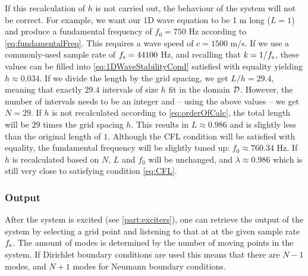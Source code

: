 If this recalculation of $h$ is not carried out, the behaviour of the system will not be correct. For example, we want our 1D wave equation to be 1 m long ($L = 1$) and produce a fundamental frequency of $f_0 = 750$ Hz according to \eqref{eq:fundamentalFreq}. This requires a wave speed of $c = 1500$ m/s. If we use a commonly-used sample rate of $f_\text{s} = 44100$ Hz, and recalling that $k = 1/f_\text{s}$, these values can be filled into \eqref{eq:1DWaveStabilityCond} satisfied with equality yielding $h \approx 0.034$. If we divide the length by the grid spacing, we get $L / h = 29.4$, meaning that exactly $29.4$ intervals of size $h$ fit in the domain $\mathcal{D}$. However, the number of intervals needs to be an integer and -- using the above values -- we get $N = 29$. If $h$ is not recalculated according to \eqref{eq:orderOfCalc}, the total length will be $29$ times the grid spacing $h$. This results in $L \approx 0.986$ and is slightly less than the original length of $1$. Although the CFL condition will be satisfied with equality, the fundamental frequency will be slightly tuned up: $f_0 \approx 760.34$ Hz. If $h$ is recalculated based on $N$, $L$ and $f_0$ will be unchanged, and $\lambda \approx 0.986$ which is still very close to satisfying condition \eqref{eq:CFL}.


\subsubsection{Output}
After the system is excited (see \ref{part:exciters}), one can retrieve the output of the system by selecting a grid point and listening to that at at the given sample rate $f_\text{s}$. The amount of modes is determined by the number of moving points in the system. If Dirichlet boundary conditions are used this means that there are $N-1$ modes, and $N+1$ modes for Neumann boundary conditions.

